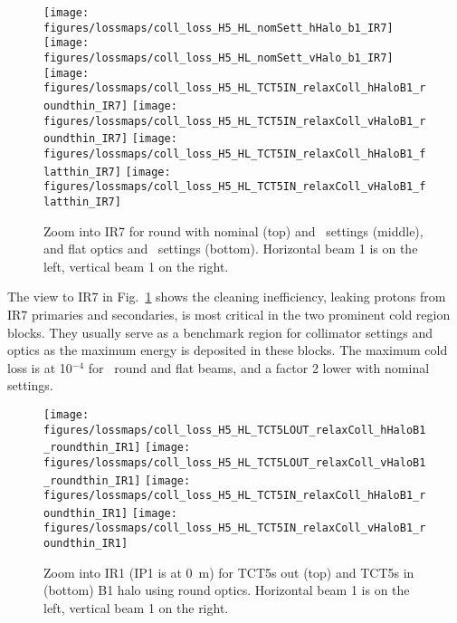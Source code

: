 \begin{figure}%
\begin{center}
\texttt{[image: figures/lossmaps/coll\_loss\_H5\_HL\_nomSett\_hHalo\_b1\_IR7]}
\texttt{[image: figures/lossmaps/coll\_loss\_H5\_HL\_nomSett\_vHalo\_b1\_IR7]}
\texttt{[image: figures/lossmaps/coll\_loss\_H5\_HL\_TCT5IN\_relaxColl\_hHaloB1\_roundthin\_IR7]}
\texttt{[image: figures/lossmaps/coll\_loss\_H5\_HL\_TCT5IN\_relaxColl\_vHaloB1\_roundthin\_IR7]}
\texttt{[image: figures/lossmaps/coll\_loss\_H5\_HL\_TCT5IN\_relaxColl\_hHaloB1\_flatthin\_IR7]}
\texttt{[image: figures/lossmaps/coll\_loss\_H5\_HL\_TCT5IN\_relaxColl\_vHaloB1\_flatthin\_IR7]}
\end{center}
\vspace{-0.3cm}
 \caption{Zoom into IR7 for round with nominal (top) and \twosigmaret~settings (middle), and flat optics and \twosigmaret~settings (bottom). Horizontal beam 1 is on the left, vertical beam 1 on the right.
  \label{IR7_zooms}}
\end{figure}

The view to IR7 in Fig.~\ref{IR7_zooms} shows the cleaning inefficiency, leaking protons from IR7 primaries and secondaries, is most critical in the two prominent cold region blocks. They usually serve as a benchmark region for collimator settings and optics as the maximum energy is deposited in these blocks. The maximum cold loss is at 10$^{-4}$ for \twosigmaret~round and flat beams, and a factor 2 lower with nominal settings.

\begin{figure}%
\begin{center}
\texttt{[image: figures/lossmaps/coll\_loss\_H5\_HL\_TCT5LOUT\_relaxColl\_hHaloB1\_roundthin\_IR1]}
\texttt{[image: figures/lossmaps/coll\_loss\_H5\_HL\_TCT5LOUT\_relaxColl\_vHaloB1\_roundthin\_IR1]}
\texttt{[image: figures/lossmaps/coll\_loss\_H5\_HL\_TCT5IN\_relaxColl\_hHaloB1\_roundthin\_IR1]}
\texttt{[image: figures/lossmaps/coll\_loss\_H5\_HL\_TCT5IN\_relaxColl\_vHaloB1\_roundthin\_IR1]}
\end{center}
\vspace{-0.3cm}
 \caption{Zoom into IR1 (IP1 is at 0~m) for TCT5s out (top) and TCT5s in (bottom) B1 halo using round optics. Horizontal beam 1 is on the left, vertical beam 1 on the right.
  \label{IR1_roundB1}}
\end{figure}

